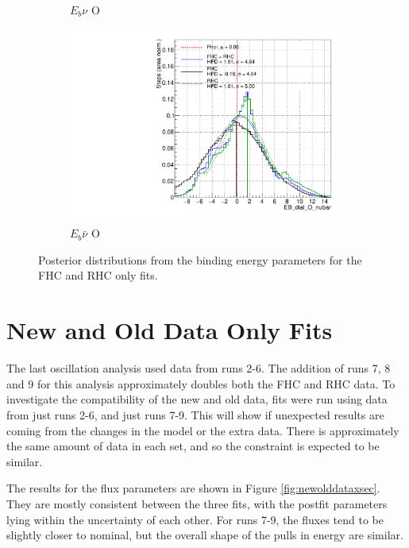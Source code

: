 \begin{figure}
\begin{subfigure}{.48\textwidth}
  \caption{$E_{b}\nu$ O}
\end{subfigure}
\begin{subfigure}{.48\textwidth}
  \centering
  \includegraphics[width=0.73\linewidth]{figs/FHCRHC_EB_dial_O_nubar}
  \caption{$E_{b}\bar{\nu}$ O}
\end{subfigure}
\caption{Posterior distributions from the binding energy parameters for the FHC and RHC only fits.}
\label{fig:FHCRHCEbdata}
\end{figure}

\section{New and Old Data Only Fits}

The last oscillation analysis\cite{} used data from runs 2-6. The addition of runs 7, 8 and 9 for this analysis approximately doubles both the FHC and RHC data. To investigate the compatibility of the new and old data, fits were run using data from just runs 2-6, and just runs 7-9. This will show if unexpected results are coming from the changes in the model or the extra data. There is approximately the same amount of data in each set, and so the constraint is expected to be similar.

The results for the flux parameters are shown in Figure \ref{fig:newolddataxsec}. They are mostly consistent between the three fits, with the postfit parameters lying within the uncertainty of each other. For runs 7-9, the fluxes tend to be slightly closer to nominal, but the overall shape of the pulls in energy are similar.

